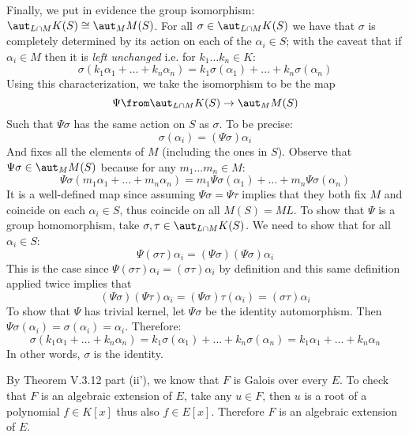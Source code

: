 Finally, we put in evidence the group isomorphism: $\aut_{L\cap M} K(S) \cong \aut_MM(S)$. 
For all $\sigma \in \aut_{L\cap M} K(S)$ we have that $\sigma$ is completely determined by its action on each of the $\alpha_i \in S$; with the caveat that if $\alpha_i \in M$ then it is \emph{left unchanged} i.e. for $k_1\ldots k_n \in K$:
$$\sigma(k_1 \alpha_1+\ldots + k_n \alpha_n) = k_1 \sigma(\alpha_1)+\ldots +  k_n \sigma(\alpha_n)$$
Using this characterization, we take the isomorphism to be the map 
$$\Psi \from \aut_{L\cap M} K(S) \to \aut_MM(S)$$
Such that  $\Psi\sigma$ has the same action on $S$ as $\sigma$. To be precise:
$$\sigma(\alpha_i)=(\Psi\sigma)\alpha_i$$
And fixes all the elements of $M$ (including the ones in $S$). Observe that $\Psi\sigma\in \aut_MM(S)$ because for any $m_1\ldots m_n \in M$:
$$\Psi\sigma(m_1 \alpha_1+\ldots + m_n \alpha_n) = m_1 \Psi\sigma(\alpha_1)+\ldots +  m_n \Psi\sigma(\alpha_n)$$
It is a well-defined map since assuming $\Psi \sigma = \Psi \tau$ implies that they  both fix $M$ and coincide on each $\alpha_i \in S$, thus coincide on all $M(S)=ML$.
To show that $\Psi$ is a group homomorphism, take $\sigma, \tau\in   \aut_{L\cap M} K(S)$. We need to show that for all $\alpha_i \in S$:
$$\Psi(\sigma \tau)\alpha_i= (\Psi\sigma)(\Psi\sigma)\alpha_i$$   
This is the case since $\Psi(\sigma \tau)\alpha_i =(\sigma\tau)\alpha_i$ by definition and this same definition applied twice implies that 
$$(\Psi\sigma)(\Psi\tau)\alpha_i=(\Psi\sigma)\tau (\alpha_i)=(\sigma\tau)\alpha_i$$
To show that $\Psi$ has trivial kernel, let $\Psi\sigma$ be the identity automorphism. Then $\Psi\sigma(\alpha_i) = \sigma(\alpha_i)=\alpha_i$. Therefore: 
$$\sigma(k_1 \alpha_1+\ldots + k_n \alpha_n) = k_1 \sigma(\alpha_1)+\ldots +  k_n \sigma(\alpha_n)=k_1 \alpha_1+\ldots + k_n \alpha_n$$
In other words, $\sigma$ is the identity.

By Theorem V.3.12 part (ii'), we know that $F$ is Galois over every $E$. To check that $F$ is an algebraic extension of $E$, take any $u\in F$, then $u$ is a root of a polynomial  $f\in K[x]$ thus also  $f\in E[x]$. Therefore $F$ is an algebraic extension of $E$.

